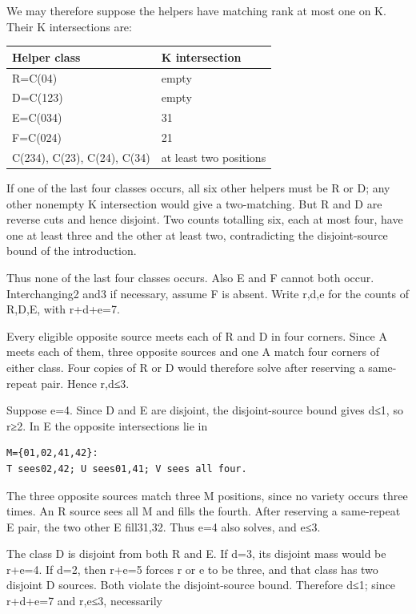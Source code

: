 \documentclass[
  10pt,
]{article}
\begin{document}
We may therefore suppose the helpers have matching rank at most one on
K. Their K intersections are:

\begin{longtable}[]{@{}ll@{}}
\toprule\noalign{}
Helper class & K intersection \\
\midrule\noalign{}
\endhead
\bottomrule\noalign{}
\endlastfoot
R=C(04) & empty \\
D=C(123) & empty \\
E=C(034) & 31 \\
F=C(024) & 21 \\
C(234), C(23), C(24), C(34) & at least two positions \\
\end{longtable}

If one of the last four classes occurs, all six other helpers must be R
or D; any other nonempty K intersection would give a two-matching. But R
and D are reverse cuts and hence disjoint. Two counts totalling six,
each at most four, have one at least three and the other at least two,
contradicting the disjoint-source bound of the introduction.

Thus none of the last four classes occurs. Also E and F cannot both
occur. Interchanging2 and3 if necessary, assume F is absent. Write r,d,e
for the counts of R,D,E, with r+d+e=7.

Every eligible opposite source meets each of R and D in four corners.
Since A meets each of them, three opposite sources and one A match four
corners of either class. Four copies of R or D would therefore solve
after reserving a same-repeat pair. Hence r,d≤3.

Suppose e=4. Since D and E are disjoint, the disjoint-source bound gives
d≤1, so r≥2. In E the opposite intersections lie in

\begin{verbatim}
M={01,02,41,42}:
T sees02,42; U sees01,41; V sees all four.
\end{verbatim}

The three opposite sources match three M positions, since no variety
occurs three times. An R source sees all M and fills the fourth. After
reserving a same-repeat E pair, the two other E fill31,32. Thus e=4 also
solves, and e≤3.

The class D is disjoint from both R and E. If d=3, its disjoint mass
would be r+e=4. If d=2, then r+e=5 forces r or e to be three, and that
class has two disjoint D sources. Both violate the disjoint-source
bound. Therefore d≤1; since r+d+e=7 and r,e≤3, necessarily
\end{document}

